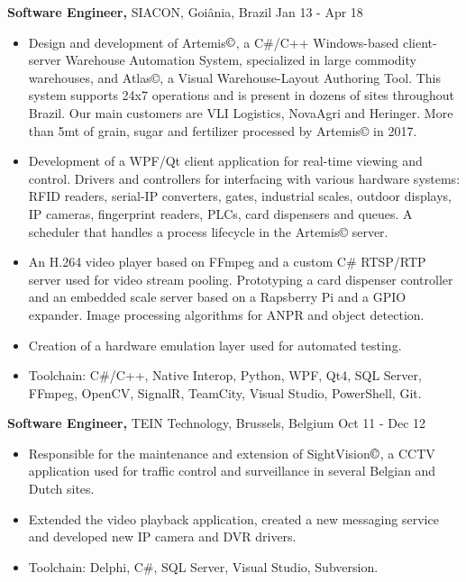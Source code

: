 \documentclass[margin]{res}
\begin{document}
\begin{resume}
 {\bf Software Engineer,} SIACON, Goiânia, Brazil \hfill Jan 13 - Apr 18
 \begin{itemize} \itemsep -2pt  %
 \item Design and development of Artemis$\copyright$, a C\#/C++ Windows-based client-server Warehouse Automation System, specialized in large commodity warehouses, and Atlas©, a Visual Warehouse-Layout Authoring Tool. This system supports 24x7 operations and is present in dozens of sites throughout Brazil. Our main customers are VLI Logistics, NovaAgri and Heringer. More than 5mt of grain, sugar and fertilizer processed by Artemis© in 2017.
 \item Development of a WPF/Qt client application for real-time viewing and control. Drivers and controllers for interfacing with various hardware systems: RFID readers, serial-IP converters, gates, industrial scales, outdoor displays, IP cameras, fingerprint readers, PLCs, card dispensers and queues. A scheduler that handles a process lifecycle in the Artemis© server.
 \item An H.264 video player based on FFmpeg and a custom C\# RTSP/RTP server used for video stream pooling. Prototyping a card dispenser controller and an embedded scale server based on a Rapsberry Pi and a GPIO expander. Image processing algorithms for ANPR and object detection.
 \item Creation of a hardware emulation layer used for automated testing.
 \item Toolchain: C\#/C++, Native Interop, Python, WPF, Qt4, SQL Server, FFmpeg, OpenCV, SignalR, TeamCity, Visual Studio, PowerShell, Git.
\end{itemize}

 {\bf Software Engineer,} TEIN Technology, Brussels, Belgium \hfill Oct 11 - Dec 12
 \begin{itemize} \itemsep -2pt  %
 \item Responsible for the maintenance and extension of SightVision$\copyright$, a CCTV application used for traffic control and surveillance in several Belgian and Dutch sites.
 \item Extended the video playback application, created a new messaging service and developed new IP camera and DVR drivers.
 \item Toolchain: Delphi, C\#, SQL Server, Visual Studio, Subversion.
 \end{itemize}


\end{resume}
\end{document}
